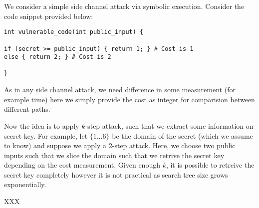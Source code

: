 \documentclass[11pt]{report}
\begin{document}
We consider a simple side channel attack via symbolic execution.
Consider the code snippet provided below:
\begin{verbatim}
int vulnerable_code(int public_input) {

if (secret >= public_input) { return 1; } # Cost is 1
else { return 2; } # Cost is 2

}
\end{verbatim}

As in any side channel attack, we need difference in some measurement (for example time) here we simply provide the cost as integer
for comparision between different paths.

Now the idea is to apply $k$-step attack, such that we extract some information on secret key.
For example, let $\{1 \dots 6\}$ be the domain of the secret (which we assume to know) and suppose we apply a $2$-step attack.
Here, we choose two public inputs such that we slice the domain such that we retrive the secret key depending on the cost measurement.
Given enough $k$, it is possible to retreive the secret key completely however it is not practical as search tree size grows exponentially.

XXX



\end{document}
